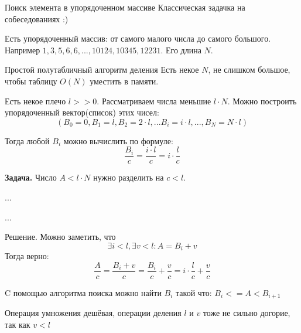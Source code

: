 \begin{frame}{Поиск элемента в упорядоченном массиве}
	Классическая задачка на собеседованиях :)
	
	Есть упорядоченный массив: от самого малого числа до самого большого. 
	Например $1, 3, 5, 6, 6, ..., 10124, 10345, 12231$. 
	Его длина $N$.
	
	
	
\end{frame}


\begin{frame}{Простой полутабличный алгоритм деления}\label{frame:example_table_method}
	Есть некое $N$, не слишком большое, чтобы таблицу $O(N)$ уместить в памяти.
	
	Есть некое плечо $l>>0$. Рассматриваем числа меньшие $l \cdot N$. 
	Можно построить упорядоченный вектор(список) этих чисел:
	\begin{equation}\label{eq:example_table_method_vector_def}
	(B_0=0, B_1 = l, B_2 = 2 \cdot l, ... B_i = i \cdot l, ..., B_N = N \cdot l )
	\end{equation} 
	
	Тогда любой $B_i$ можно вычислить по формуле:
	\begin{equation}\label{eq:example_table_method_B_i}
	\frac{B_i}{c} = \frac{i \cdot l}{c} = i \cdot \frac{l}{c}
	\end{equation}
	
	
 
 	\textbf{Задача.} Число $A < l \cdot N$ нужно разделить на $c<l$.
	
	...
\end{frame}
\begin{frame}
 	...
 	
 	Решение. Можно заметить, что 
 	\begin{equation}
 	\exists i<l, \exists v<l: A = B_i+v
 	\end{equation}
 	Тогда верно:
 	\begin{equation}
 	\frac{A}{c} = \frac{B_i+v}{c} = \frac{B_i}{c} + \frac{v}{c} = i \cdot \frac{l}{c} + \frac{v}{c}
 	\end{equation}
 	
 	C помощью алгоритма поиска можно найти $B_i$ такой что: $B_i <= A < B_{i+1}$ %
 	
 	Операция умножения дешёвая, операции деления $l$ и $v$ тоже не сильно догорие, 
 	так как $v<l$
 	
 	
 
		
	
\end{frame}




